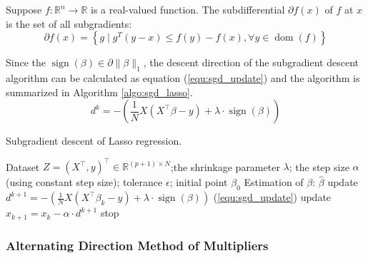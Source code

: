 \documentclass[11pt,en,authoryear]{elegantpaper}
\numberwithin{equation}{section}
\newcommand{\mbR}{\mathbb{R}}
\begin{document}
\begin{definition}\label{def:subgrad}
Suppose $f: \mbR^{n}\rightarrow \mbR$ is a real-valued function. The subdifferential $\partial f(x)$ of $f$ at $x$ is the set of all subgradients:
\begin{equation}
    \partial f(x)=\left\{g \mid g^{T}(y-x) \leq f(y)-f(x), \forall y \in \operatorname{dom}(f)\right\}
\end{equation}
\end{definition}
Since the $\operatorname{sign}(\beta) \in \partial \|\beta \|_1$, the descent direction of the subgradient descent algorithm can be calculated as equation (\ref{equ:sgd_update}) and the algorithm is summarized in Algorithm \ref{algo:sgd_lasso}.
\begin{equation}\label{equ:sgd_update}
    d^{k}=-\left(\frac{1}{N}X(X^{\top}\beta-y)+\lambda \cdot \operatorname{sign}(\beta)\right)
\end{equation}

\begin{center}
\begin{minipage}{13.5cm}
	  \begin{algorithm}[H]
  \caption{Subgradient descent of Lasso regression.}\label{algo:sgd_lasso}
  \begin{algorithmic}[1]
    \Require
      Dataset $Z = (X^{\top}, y)^{\top} \in \mbR^{(p+1) \times N}$;the shrinkage parameter $\lambda$;  the step size $\alpha$ (using constant step size); tolerance $\epsilon$; initial point $\beta_0$
    \Ensure Estimation of $\beta$: $\hat{\beta}$
    {
    \State update $d^{k+1} = -\left(\frac{1}{N}X(X^{\top}\beta_k-y)+\lambda \cdot \operatorname{sign}(\beta)\right)$ \quad (\ref{equ:sgd_update})
    \State update $x_{k+1}= x_k - \alpha \cdot d^{k+1}$
    \State stop
    \EndIf
    }
    \EndFor
  \end{algorithmic}
\end{algorithm}
\end{minipage}
\end{center}

\subsubsection{Alternating Direction Method of Multipliers}
\end{document}
